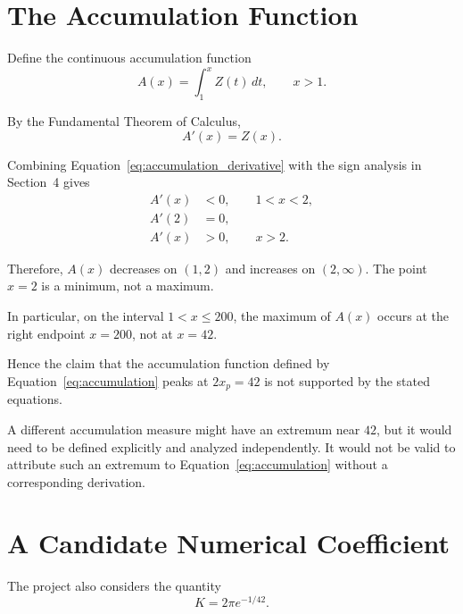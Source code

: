 \documentclass[11pt,a4paper]{article}
\begin{document}
\section{The Accumulation Function}

Define the continuous accumulation function
\begin{equation}
A(x)=\int_1^x Z(t)\,dt,\qquad x>1.
\label{eq:accumulation}
\end{equation}

By the Fundamental Theorem of Calculus,
\begin{equation}
A'(x)=Z(x).
\label{eq:accumulation_derivative}
\end{equation}

Combining Equation~\eqref{eq:accumulation_derivative} with
the sign analysis in Section~4 gives
\begin{align}
A'(x)&<0,\qquad 1<x<2,\\
A'(2)&=0,\\
A'(x)&>0,\qquad x>2.
\end{align}

Therefore, \(A(x)\) decreases on \((1,2)\) and increases on
\((2,\infty)\). The point \(x=2\) is a minimum, not a maximum.

In particular, on the interval \(1<x\leq200\), the maximum
of \(A(x)\) occurs at the right endpoint \(x=200\), not at
\(x=42\).

Hence the claim that the accumulation function defined by
Equation~\eqref{eq:accumulation} peaks at \(2x_p=42\) is
not supported by the stated equations.

A different accumulation measure might have an extremum
near \(42\), but it would need to be defined explicitly and
analyzed independently. It would not be valid to attribute
such an extremum to Equation~\eqref{eq:accumulation} without
a corresponding derivation.

\section{A Candidate Numerical Coefficient}

The project also considers the quantity
\begin{equation}
K=2\pi e^{-1/42}.
\label{eq:K}
\end{equation}
\end{document}
